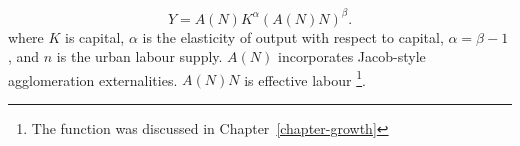 \begin{equation}
Y=A(N)K^{\alpha }(A(N)N)^\beta.
\label{Eqn:Prod1}
\end{equation}
where $K$ is capital, $\alpha$ is the elasticity of output with respect to capital, $\alpha = \beta - 1$, and  $n$ is the \gls{urban labour supply}. $A(N)$ incorporates Jacob-style agglomeration externalities. $A(N)N$ is \gls{effective labour} \footnote{The function  was discussed in Chapter~\ref{chapter-growth}}. 



 



